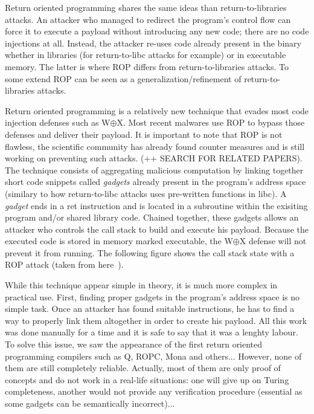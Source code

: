 \documentclass[10pt,twocolumn]{article}
\begin{document}
Return oriented programming shares the same ideas than return-to-libraries
attacks. An attacker who managed to redirect the program's control flow can
force it to execute a payload without introducing any new code; there are no
code injections at all. Instead, the attacker re-uses code already present in
the binary whether in libraries (for return-to-libc attacks for example) or in
executable memory. The latter is where ROP differs from return-to-libraries
attacks. To some extend ROP can be seen as a generalization/refinement of
return-to-libraries attacks.

Return oriented programming is a relatively new technique that evades most code
injection defenses such as W$\oplus$X. Most recent malwares use ROP to bypass
those defenses and deliver their payload. It is important to note that ROP is
not flawless, the scientific community has already found counter measures and
is still working on preventing such attacks. (++ SEARCH FOR RELATED PAPERS).
The technique consists of aggregating malicious computation by linking together
short code snippets called \textit{gadgets} already present in the program's
address space (similary to how return-to-libc attacks uses pre-written
functions in libc).  A \textit{gadget} ends in a ret instruction and is located
in a subroutine within the exisiting program and/or shared library code.
Chained together, these gadgets allows an attacker who controls the call stack
to build and execute his payload. Because the executed code is stored in memory
marked executable, the W$\oplus$X defense will not prevent it from running. The
following figure shows the call stack state with a ROP attack (taken from
here~\cite{bletsch_jump-oriented_2011}).

While this technique appear simple in theory, it is much more complex in
practical use. First, finding proper gadgets in the program's address space is
no simple task. Once an attacker has found suitable instructions, he has to
find a way to properly link them altogether in order to create his payload. All
this work was done manually for a time and it is safe to say that it was a
lenghty labour. To solve this issue, we saw the appearance of the first return
oriented programming compilers such as Q, ROPC, Mona and others... However,
none of them are still completely reliable. Actually, most of them are only
proof of concepts and do not work in a real-life situations: one will give up
on Turing completeness, another would not provide any verification procedure
(essential as some gadgets can be semantically incorrect)...
\end{document}
